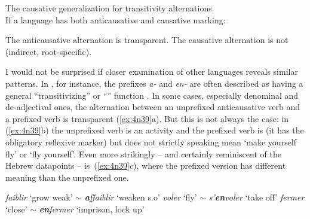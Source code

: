 \begin{exe}
\begin{xlist}
\begin{xlist}
\begin{exe}
\begin{exe}
\begin{xlist}
\begin{exe}
\begin{xlist}
\begin{exe}
\begin{xlist}
\begin{xlist}
\begin{exe}
\begin{xlist}
\begin{exe}
\begin{xlist}
\begin{exe}
\begin{xlist}
\begin{exe}
\begin{exe}
\begin{exe}
\begin{xlist}
\begin{exe}
\begin{exe}
\begin{xlist}
\begin{xlist}
\begin{exe}
\begin{xlist}
\begin{exe}
\begin{exe}
\begin{xlist}
\begin{exe}
\begin{exe}
\begin{xlist}
\begin{exe}
\begin{xlist}
\begin{exe}
\begin{xlist}
\begin{exe}
\begin{xlist}
\begin{exe}
\begin{exe}
\begin{xlist}
\begin{exe}
\begin{exe}
\begin{xlist}
\begin{xlist}
\begin{exe}
\begin{xlist}
\begin{xlist}
\begin{exe}
\begin{xlist}
\begin{exe}
\begin{xlist}
 \begin{exe}
 \ex \label{ex:vd:causgen}The causative generalization for transitivity alternations\\
 	If a language has both anticausative and causative marking:
 \begin{xlist} 
 	\ex  The anticausative alternation is transparent. 
 	\ex  The causative alternation is not (indirect, root-specific). 
 \z
\z 

I would not be surprised if closer examination of other languages reveals similar patterns. In , for instance, the prefixes \emph{a-} and \emph{en-} are often described as having a general ``transitivizing'' or ``'' function \citep{junker87}. In some cases, especially denominal and de-adjectival ones, the  alternation between an unprefixed anticausative verb and a prefixed  verb is transparent (\ref{ex:4n39}a). But this is not always the case: in (\ref{ex:4n39}b) the unprefixed verb is an activity and the prefixed verb is  (it has the obligatory reflexive marker) but does not strictly speaking mean `make yourself fly' or `fly yourself'. Even more strikingly -- and certainly reminiscent of the Hebrew datapoints -- is~(\ref{ex:4n39}c), where the prefixed version has different meaning than the unprefixed one.
 \begin{exe}
\ex  {}\label{ex:4n39}
	\begin{xlist}
	\ex \emph{faiblir}	`grow weak' $\sim$ 	\emph{\textbf{a}ffaiblir} `weaken s.o'
	\ex \emph{voler} `fly' $\sim$ \emph{s'\textbf{en}voler} `take off'
	\ex \emph{fermer}	`close' $\sim$ \emph{\textbf{en}fermer} `imprison, lock up'
\z
 \z 

\end{xlist}
\end{exe}
\end{xlist}
\end{exe}
\end{xlist}
\end{exe}
\end{xlist}
\end{exe}
\end{xlist}
\end{xlist}
\end{exe}
\end{xlist}
\end{xlist}
\end{exe}
\end{exe}
\end{xlist}
\end{exe}
\end{exe}
\end{xlist}
\end{exe}
\end{xlist}
\end{exe}
\end{xlist}
\end{exe}
\end{xlist}
\end{exe}
\end{exe}
\end{xlist}
\end{exe}
\end{exe}
\end{xlist}
\end{exe}
\end{xlist}
\end{xlist}
\end{exe}
\end{exe}
\end{xlist}
\end{exe}
\end{exe}
\end{exe}
\end{xlist}
\end{exe}
\end{xlist}
\end{exe}
\end{xlist}
\end{exe}
\end{xlist}
\end{xlist}
\end{exe}
\end{xlist}
\end{exe}
\end{xlist}
\end{exe}
\end{exe}
\end{xlist}
\end{xlist}
\end{exe}
